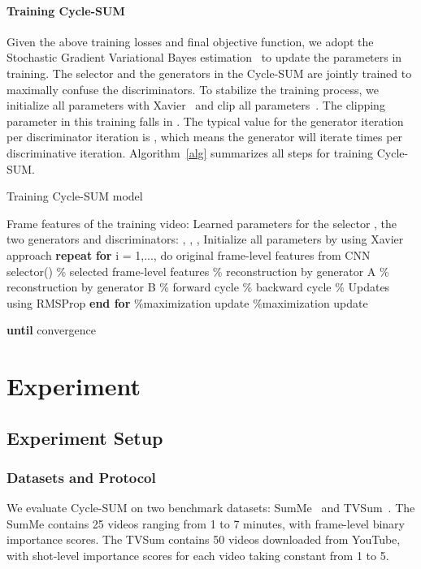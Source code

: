\documentclass[letterpaper]{article} \usepackage{aaai19}  \usepackage{times}  \usepackage{helvet}  \usepackage{courier}  \usepackage{url}  \usepackage{graphicx}  \frenchspacing  \setlength{\pdfpagewidth}{8.5in}  \setlength{\pdfpageheight}{11in}  \usepackage{amsmath}
\begin{document}
\paragraph{Training Cycle-SUM}
Given the above training losses and final objective function, we adopt the Stochastic Gradient Variational Bayes estimation~\cite{kingma2014stochastic} to update the parameters in training.
The selector and the generators in the Cycle-SUM are jointly trained to maximally confuse the discriminators. To stabilize the training process, we initialize all parameters with Xavier~\cite{glorot2010understanding} and clip all parameters~\cite{arjovsky2017wasserstein}. The clipping parameter  in this training falls in . The typical value for the generator iteration per discriminator iteration  is , which means the generator will iterate  times per discriminative iteration. Algorithm~\ref{alg} summarizes all steps for training Cycle-SUM.


\begin{algorithm}[h]
\caption{ Training Cycle-SUM model}
\label{alg}
\begin{algorithmic}[1]
\REQUIRE
Frame features of the training video: 
\ENSURE
Learned parameters for the selector , the two generators and discriminators: , , , 
\STATE
Initialize all parameters by using Xavier approach
\STATE \textbf{repeat}
\STATE \quad \textbf{for} i = 1,..., do
\STATE \qquad  original frame-level features from CNN
\STATE \qquad  selector() \% selected frame-level features
\STATE \qquad   \% {reconstruction by generator A}
\STATE \qquad   \% reconstruction by generator B
\STATE \qquad   \% forward cycle
\STATE \qquad   \% backward cycle
\STATE \qquad \% Updates using RMSProp
\STATE \qquad 
\STATE \qquad 
\STATE \quad \textbf{end for}
\STATE \quad  \%maximization update
\STATE \quad 
\STATE \quad  \%maximization update
\STATE \quad 

\STATE
\textbf{until} convergence
\end{algorithmic}
\end{algorithm}


\section{Experiment}
\subsection{Experiment Setup}
\subsubsection{Datasets and Protocol}
We evaluate Cycle-SUM on two  benchmark datasets: SumMe~\cite{gygli2014creating} and TVSum~\cite{song2015tvsum}. The SumMe contains 25 videos  ranging from 1 to 7 minutes, with frame-level binary importance scores. The TVSum contains 50  videos downloaded from YouTube, with shot-level importance scores for each video taking constant from 1 to 5.
\end{document}
